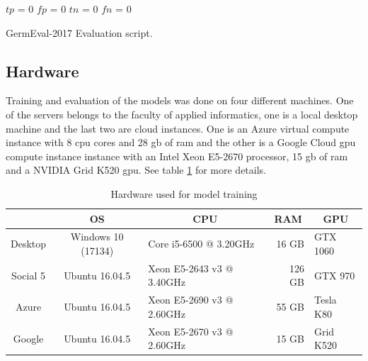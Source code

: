 \begin{algorithm}
	
	
	
	$tp$ = 0
	$fp$ = 0
	$tn$ = 0	
	$fn$ = 0
	
	
	
	\caption{GermEval-2017 Evaluation script.}
	\label{algo:05_germeval}
\end{algorithm}

\subsection{Hardware}

Training and evaluation of the models was done on four different machines. One of the servers belongs to the faculty of applied informatics, one is a local desktop machine and the last two are cloud instances. One is an Azure virtual compute instance with 8 \gls{cpu} cores and 28 \gls{gb} of \gls{ram} and the other is a Google Cloud \gls{gpu} compute instance instance with an Intel Xeon E5-2670 processor, 15 \gls{gb} of \gls{ram} and a NVIDIA Grid K520 \gls{gpu}. See table \ref{tab:05_usedHardware} for more details.
\begin{table}
	\centering
	\caption{Hardware used for model training}
	\label{tab:05_usedHardware}
	\begin{tabular}{@{}cclrl@{}}
		\toprule
		\multicolumn{1}{c}{\textbf{}}    & \multicolumn{1}{c}{\textbf{OS}} & \multicolumn{1}{c}{\textbf{CPU}}                    & \multicolumn{1}{c}{\textbf{RAM}} & \multicolumn{1}{c}{\textbf{GPU}}     \\ \midrule
		Desktop      & Windows 10 (17134)        & Core i5-6500 @ 3.20GHz     & 16 GB        & GTX 1060 \\
		Social 5     & Ubuntu 16.04.5            & Xeon E5-2643 v3 @ 3.40GHz  & 126 GB        & GTX 970 \\ 
		Azure        & Ubuntu 16.04.5            & Xeon E5-2690 v3 @ 2.60GHz  & 55 GB        & Tesla K80 \\ 
		Google        & Ubuntu 16.04.5            & Xeon E5-2670 v3 @ 2.60GHz  & 15 GB        & Grid K520 \\
		
		\bottomrule
	\end{tabular}
\end{table}


